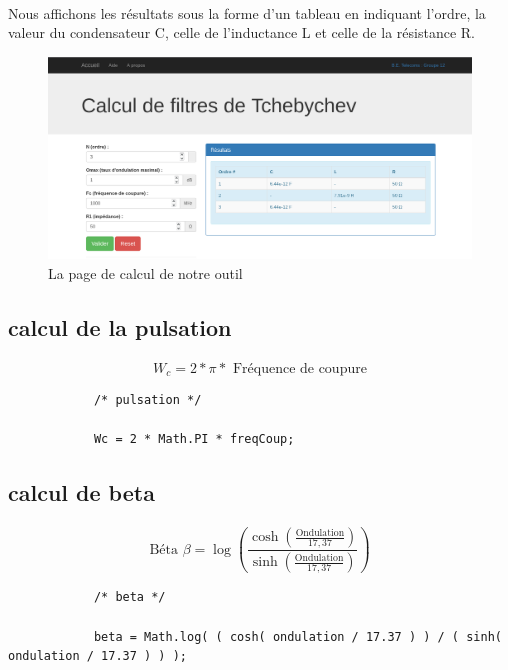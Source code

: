 \documentclass[a4paper,11pt]{article}
\begin{document}
    \paragraph{}
Nous affichons les résultats sous la forme d’un tableau en indiquant l’ordre, la valeur du condensateur C, celle de l’inductance L et celle de la résistance R.
    \\
    \begin{figure}[h]
        \begin{center}
            \includegraphics[scale=0.3]{images/filtres/screen-site.png}
        \end{center}
            \caption{ La page de calcul de notre outil }
            \label{La page de calcul de notre outil de calcul de filtres de Tchebyscheff}
    \end{figure}

    \clearpage

    \subsection{calcul de la pulsation}
        \paragraph{}
        \[ W_{c} = 2 * \pi * \mbox{ Fréquence de coupure}\]
        \begin{lstlisting}
            /* pulsation */

            Wc = 2 * Math.PI * freqCoup;

        \end{lstlisting}

    \subsection{calcul de beta}
        \paragraph{}
        \[ \mbox{Béta } \beta = \log( \frac{ \cosh( \frac{ \mbox{Ondulation} }{17,37} ) } { \sinh( \frac{ \mbox{Ondulation} }{17,37} ) } )\]
        \begin{lstlisting}
            /* beta */

            beta = Math.log( ( cosh( ondulation / 17.37 ) ) / ( sinh( ondulation / 17.37 ) ) );

        \end{lstlisting}
\end{document}
